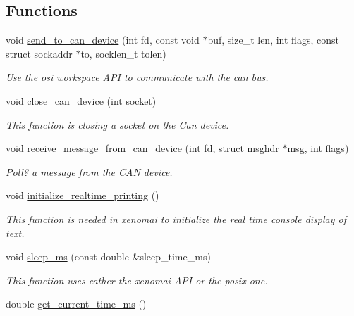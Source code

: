 \subsection*{Functions}
\begin{DoxyCompactItemize}
\item 
void \hyperlink{namespaceosi_a001686caee0f34611f14ab94c7303254}{send\+\_\+to\+\_\+can\+\_\+device} (int fd, const void $\ast$buf, size\+\_\+t len, int flags, const struct sockaddr $\ast$to, socklen\+\_\+t tolen)
\begin{DoxyCompactList}\small\item\em Use the osi workspace A\+PI to communicate with the can bus. \end{DoxyCompactList}\item 
void \hyperlink{namespaceosi_a92dc20de3b4933a10f24c98cecf2568b}{close\+\_\+can\+\_\+device} (int socket)
\begin{DoxyCompactList}\small\item\em This function is closing a socket on the Can device. \end{DoxyCompactList}\item 
void \hyperlink{namespaceosi_a244466c0afc9ae9fe059cee665fb0603}{receive\+\_\+message\+\_\+from\+\_\+can\+\_\+device} (int fd, struct msghdr $\ast$msg, int flags)
\begin{DoxyCompactList}\small\item\em Poll? a message from the C\+AN device. \end{DoxyCompactList}\item 
\mbox{\label{namespaceosi_a48e36c862c77befc86f53140722c3f43}} 
void \hyperlink{namespaceosi_a48e36c862c77befc86f53140722c3f43}{initialize\+\_\+realtime\+\_\+printing} ()
\begin{DoxyCompactList}\small\item\em This function is needed in xenomai to initialize the real time console display of text. \end{DoxyCompactList}\item 
void \hyperlink{namespaceosi_a499cdf6336a907d1327044b0f595f3a9}{sleep\+\_\+ms} (const double \&sleep\+\_\+time\+\_\+ms)
\begin{DoxyCompactList}\small\item\em This function uses eather the xenomai A\+PI or the posix one. \end{DoxyCompactList}\item 
double \hyperlink{namespaceosi_a2409ab591c4f78d9a8bcfbbe38df9429}{get\+\_\+current\+\_\+time\+\_\+ms} ()

\end{DoxyCompactItemize}
